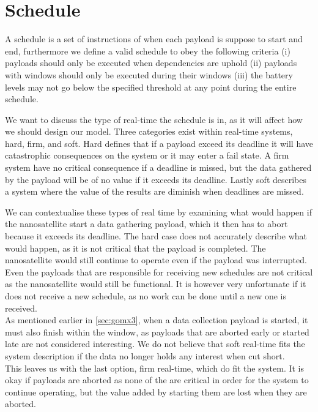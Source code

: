 \section{Schedule} \label{sec:schedule}
A schedule is a set of instructions of when each payload is suppose to start and end, furthermore we define a valid schedule to obey the following criteria (i) payloads should only be executed when dependencies are uphold (ii) payloads with windows should only be executed during their windows (iii) the battery levels may not go below the specified threshold at any point during the entire schedule.

We want to discuss the type of real-time the schedule is in, as it will affect how we should design our model.
Three categories exist within real-time systems, hard, firm, and soft. Hard defines that if a payload exceed its deadline it will have catastrophic consequences on the system or it may enter a fail state. A firm system have no critical consequence if a deadline is missed, but the data gathered by the payload will be of no value if it exceeds its deadline. Lastly soft describes a system where the value of the results are diminish when deadlines are missed\cite{real_time_computing}.

We can contextualise these types of real time by examining what would happen if the nanosatellite start a data gathering payload, which it then has to abort because it exceeds its deadline.
The hard case does not accurately describe what would happen, as it is not critical that the payload is completed. The nanosatellite would still continue to operate even if the payload was interrupted. Even the payloads that are responsible for receiving new schedules are not critical as the nanosatellite would still be functional. It is however very unfortunate if it does not receive a new schedule, as no work can be done until a new one is received.\\
As mentioned earlier in  \ref{sec:gomx3}, when a data collection payload is started, it must also finish within the window, as payloads that are aborted early or started late are not considered interesting. We do not believe that soft real-time fits the system description if the data no longer holds any interest when cut short.\\
This leaves us with the last option, firm real-time, which do fit the system. It is okay if payloads are aborted as none of the are  critical in order for the system to continue operating, but the value added by starting them are lost when they are aborted.
